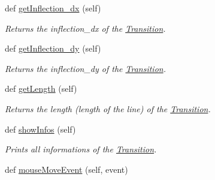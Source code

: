 \begin{DoxyCompactItemize}
\mbox{\label{classTransition_1_1Transition_ad359213002981a70c08b539ff18b5d6f}} 
def \mbox{\hyperlink{classTransition_1_1Transition_ad359213002981a70c08b539ff18b5d6f}{get\+Inflection\+\_\+dx}} (self)
\begin{DoxyCompactList}\small\item\em Returns the inflection\+\_\+dx of the \mbox{\hyperlink{classTransition_1_1Transition}{Transition}}. \end{DoxyCompactList}\item 
\mbox{\label{classTransition_1_1Transition_a8046aa1ba44a92c968003c69950539ff}} 
def \mbox{\hyperlink{classTransition_1_1Transition_a8046aa1ba44a92c968003c69950539ff}{get\+Inflection\+\_\+dy}} (self)
\begin{DoxyCompactList}\small\item\em Returns the inflection\+\_\+dy of the \mbox{\hyperlink{classTransition_1_1Transition}{Transition}}. \end{DoxyCompactList}\item 
\mbox{\label{classTransition_1_1Transition_a34b8fde239bb41dabea4ce46aa19e19c}} 
def \mbox{\hyperlink{classTransition_1_1Transition_a34b8fde239bb41dabea4ce46aa19e19c}{get\+Length}} (self)
\begin{DoxyCompactList}\small\item\em Returns the length (length of the line) of the \mbox{\hyperlink{classTransition_1_1Transition}{Transition}}. \end{DoxyCompactList}\item 
\mbox{\label{classTransition_1_1Transition_ad8f667cad7cc17b93bc3621b715b4800}} 
def \mbox{\hyperlink{classTransition_1_1Transition_ad8f667cad7cc17b93bc3621b715b4800}{show\+Infos}} (self)
\begin{DoxyCompactList}\small\item\em Prints all informations of the \mbox{\hyperlink{classTransition_1_1Transition}{Transition}}. \end{DoxyCompactList}\item 
\mbox{\label{classTransition_1_1Transition_a7643a42dfd0cedf8a98521e1112ba312}} 
def \mbox{\hyperlink{classTransition_1_1Transition_a7643a42dfd0cedf8a98521e1112ba312}{mouse\+Move\+Event}} (self, event)

\end{DoxyCompactItemize}
